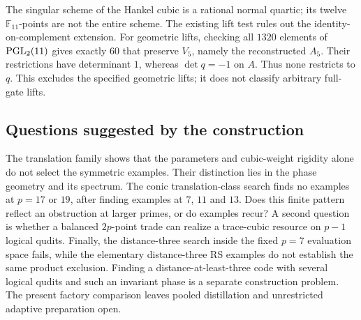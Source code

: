 The singular scheme of the Hankel cubic is a rational normal quartic;
its twelve $\mathbb F_{11}$-points are not the entire scheme.
The existing lift test rules out the identity-on-complement extension.
For geometric lifts, checking all $1320$ elements of $\operatorname{PGL}_2(11)$ gives
exactly $60$ that preserve $V_5$, namely the reconstructed $A_5$.
Their restrictions have determinant $1$, whereas $\det q=-1$ on $A$.
Thus none restricts to $q$. This excludes the specified geometric lifts;
it does not classify arbitrary full-gate lifts.

\subsection*{Questions suggested by the construction}
The translation family shows that the parameters and cubic-weight rigidity
alone do not select the symmetric examples. Their distinction lies in the
phase geometry and its spectrum. The conic translation-class search finds
no examples at $p=17$ or $19$, after finding examples at $7$, $11$ and $13$.
Does this finite pattern reflect an obstruction at larger primes, or do
examples recur? A second question is whether a balanced
$2p$-point trade can realize a trace-cubic resource on $p-1$ logical qudits.
Finally, the distance-three search inside the fixed $p=7$ evaluation space
fails, while the elementary distance-three RS examples do not establish the
same product exclusion. Finding a distance-at-least-three code with several
logical qudits and such an invariant phase is a separate construction problem.
The present factory comparison leaves pooled distillation and unrestricted
adaptive preparation open.
